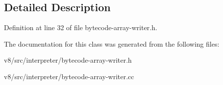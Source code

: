 \subsection{Detailed Description}


Definition at line 32 of file bytecode-\/array-\/writer.\+h.



The documentation for this class was generated from the following files\+:\begin{DoxyCompactItemize}
\item 
v8/src/interpreter/bytecode-\/array-\/writer.\+h\item 
v8/src/interpreter/bytecode-\/array-\/writer.\+cc\end{DoxyCompactItemize}

